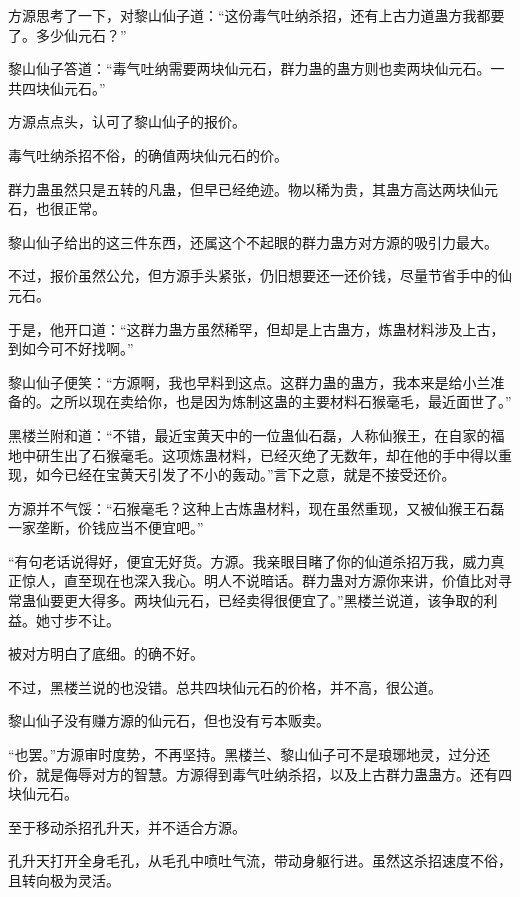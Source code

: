 
\begin{this_body}

方源思考了一下，对黎山仙子道：“这份毒气吐纳杀招，还有上古力道蛊方我都要了。多少仙元石？”

黎山仙子答道：“毒气吐纳需要两块仙元石，群力蛊的蛊方则也卖两块仙元石。一共四块仙元石。”

方源点点头，认可了黎山仙子的报价。

毒气吐纳杀招不俗，的确值两块仙元石的价。

群力蛊虽然只是五转的凡蛊，但早已经绝迹。物以稀为贵，其蛊方高达两块仙元石，也很正常。

黎山仙子给出的这三件东西，还属这个不起眼的群力蛊方对方源的吸引力最大。

不过，报价虽然公允，但方源手头紧张，仍旧想要还一还价钱，尽量节省手中的仙元石。

于是，他开口道：“这群力蛊方虽然稀罕，但却是上古蛊方，炼蛊材料涉及上古，到如今可不好找啊。”

黎山仙子便笑：“方源啊，我也早料到这点。这群力蛊的蛊方，我本来是给小兰准备的。之所以现在卖给你，也是因为炼制这蛊的主要材料石猴毫毛，最近面世了。”

黑楼兰附和道：“不错，最近宝黄天中的一位蛊仙石磊，人称仙猴王，在自家的福地中研生出了石猴毫毛。这项炼蛊材料，已经灭绝了无数年，却在他的手中得以重现，如今已经在宝黄天引发了不小的轰动。”言下之意，就是不接受还价。

方源并不气馁：“石猴毫毛？这种上古炼蛊材料，现在虽然重现，又被仙猴王石磊一家垄断，价钱应当不便宜吧。”

“有句老话说得好，便宜无好货。方源。我亲眼目睹了你的仙道杀招万我，威力真正惊人，直至现在也深入我心。明人不说暗话。群力蛊对方源你来讲，价值比对寻常蛊仙要更大得多。两块仙元石，已经卖得很便宜了。”黑楼兰说道，该争取的利益。她寸步不让。

被对方明白了底细。的确不好。

不过，黑楼兰说的也没错。总共四块仙元石的价格，并不高，很公道。

黎山仙子没有赚方源的仙元石，但也没有亏本贩卖。

“也罢。”方源审时度势，不再坚持。黑楼兰、黎山仙子可不是琅琊地灵，过分还价，就是侮辱对方的智慧。方源得到毒气吐纳杀招，以及上古群力蛊蛊方。还有四块仙元石。

至于移动杀招孔升天，并不适合方源。

孔升天打开全身毛孔，从毛孔中喷吐气流，带动身躯行进。虽然这杀招速度不俗，且转向极为灵活。


\end{this_body}

